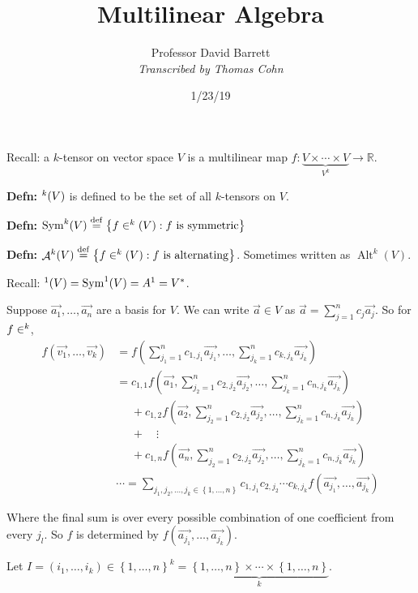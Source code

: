 \documentclass[10pt,letterpaper]{article}
\author{Professor David Barrett\\ \small\textit{Transcribed by Thomas Cohn}}
\title{Multilinear Algebra}
\date{1/23/19} %
\newcommand{\n}{\hfill\break}
\newcommand{\defn}[1]{\par\noindent\settowidth{\hangindent}{\textbf{Defn: }}\textbf{Defn: }#1\n}
\newcommand{\ptxt}[1]{\textrm{\textnormal{#1}}}
\newcommand{\set}[1]{\left\{#1\right\}}
\newcommand{\reals}{\mathbb{R}}
\newcommand{\R}{\reals}
\let\L\relax
\DeclareMathOperator{\L}{\mathscr{L}}
\DeclareMathOperator{\A}{\mathcal{A}}
\DeclareMathOperator{\Alt}{Alt}
\DeclareMathOperator{\Sym}{Sym}
\newcommand{\eqdef}{\overset{\ptxt{def}}{=}}
\newcommand{\paren}[1]{\left(#1\right)}
\begin{document}
\maketitle
\setlength\RaggedRightParindent{\parindent}
\RaggedRight

\par\noindent Recall: a $k$-tensor on vector space $V$ is a multilinear map $f:\underbrace{V\times\cdots\times{}V}_{V^{k}}\to\R$.

\defn{$\L^{k}(V)$ is defined to be the set of all $k$-tensors on $V$.}

\defn{$\Sym^{k}(V)\eqdef\set{f\in\L^{k}(V):f\ptxt{ is symmetric}}$}

\defn{$\A^{k}(V)\eqdef\set{f\in\L^{k}(V):f\ptxt{ is alternating}}$. Sometimes written as $\Alt^{k}(V)$.}

\par\noindent Recall: $\L^{1}(V)=\Sym^{1}(V)=A^{1}=V^{*}$.\n

\par\noindent Suppose $\vec{a_{1}},\ldots,\vec{a_{n}}$ are a basis for $V$. We can write $\vec{a}\in{}V$ as $\vec{a}=\sum_{j=1}^{n}c_{j}\vec{a_{j}}$. So for $f\in\L^{k}$,
\begin{align*}
	f(\vec{v_{1}},\ldots,\vec{v_{k}}) & =f\paren{\sum_{j_{1}=1}^{n}c_{1,j_{1}}\vec{a_{j_{1}}},\ldots,\sum_{j_{k}=1}^{n}c_{k,j_{k}}\vec{a_{j_{k}}}}\\
	& =c_{1,1}f\paren{\vec{a_{1}},\sum_{j_{2}=1}^{n}c_{2,j_{2}}\vec{a_{j_{2}}},\ldots,\sum_{j_{k}=1}^{n}c_{n,j_{k}}\vec{a_{j_{k}}}}\\
	& \phantom{=}+c_{1,2}f\paren{\vec{a_{2}},\sum_{j_{2}=1}^{n}c_{2,j_{2}}\vec{a_{j_{2}}},\ldots,\sum_{j_{k}=1}^{n}c_{n,j_{k}}\vec{a_{j_{k}}}}\\
	& \phantom{=}+\quad\vdots\\
	& \phantom{=}+c_{1,n}f\paren{\vec{a_{n}},\sum_{j_{2}=1}^{n}c_{2,j_{2}}\vec{a_{j_{2}}},\ldots,\sum_{j_{k}=1}^{n}c_{n,j_{k}}\vec{a_{j_{k}}}}\\
	& \cdots=\sum_{j_{1},j_{2},\ldots,j_{k}\in\set{1,\ldots,n}}c_{1,j_{1}}c_{2,j_{2}}\cdots{}c_{k,j_{k}}f(\vec{a_{j_{1}}},\ldots,\vec{a_{j_{k}}})
\end{align*}

\par\noindent Where the final sum is over every possible combination of one coefficient from every $j_{l}$.\n
So $f$ is determined by $f(\vec{a_{j_{1}}},\ldots,\vec{a_{j_{k}}})$.\n

\par\noindent Let $I=(i_{1},\ldots,i_{k})\in\set{1,\ldots,n}^{k}=\underbrace{\set{1,\ldots,n}\times\cdots\times\set{1,\ldots,n}}_{k}$.
\end{document}
